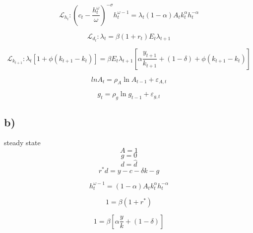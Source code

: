 \documentclass{article}
\begin{document}
\begin{enumerate}
	\begin{equation}
		\mathcal{L}_{h_{t}}: 
	(c_{t} - \dfrac{h_{t}^\omega}{\omega})^{-\sigma} h_t^{\omega-1} = \lambda_t (1-\alpha)A_t k_t^\alpha h_t^{-\alpha}
	\end{equation}
	
	\begin{equation}
		\mathcal{L}_{d_{t}}: 
		\lambda_t=\beta (1+r_t)E_t	\lambda_{t+1}
	\end{equation}
	
	\begin{equation}
		\mathcal{L}_{k_{t+1}}: 
		\lambda_{t}[1+\phi(k_{t+1}-k_t)]=\beta E_t \lambda_{t+1}[\alpha \dfrac{y_{t+1}}{k_{t+1}}+(1-\delta)+\phi(k_{t+1}-k_t)]
		\end{equation}
	
	\begin{equation}
		ln A_t=\rho_A \ln A_{t-1}+\varepsilon_{A,t}
	\end{equation}
	
	\begin{equation}
		g_t=\rho_g \ln g_{t-1}+\varepsilon_{g,t}
	\end{equation}

	
		\subsection {b)}
		steady state
		\begin{equation}
			A=1 		
		\end{equation}
		\begin{equation}
			g=0 
		\end{equation}
	    \begin{equation}
            d=\hat{d}
	    \end{equation}
		\begin{equation}
		r^*d=y-c-\delta k-g
		\end{equation}
		
		\begin{equation}
		h_t^{\omega-1} = (1-\alpha)A_t k_t^\alpha h_t^{-\alpha}
		\end{equation}
		
		\begin{equation}
			1 =\beta (1+r^*)
		\end{equation}
		
		\begin{equation}
			1 =\beta[\alpha \dfrac{y}{k}+(1-\delta)]
		\end{equation}

	
	
\end{enumerate}
	
\end{document}
